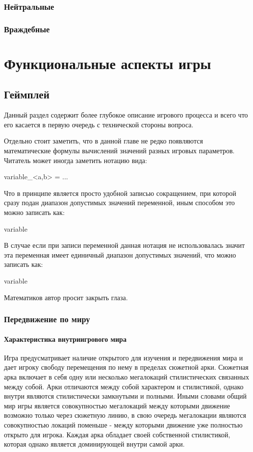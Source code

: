 \documentclass[11pt]{report}
\begin{document}
\section{Нейтральные}
\section{Враждебные}


\part{Функциональные аспекты игры}
\chapter{Геймплей}
Данный раздел содержит более глубокое описание игрового процесса и всего что его касается в первую очередь с технической стороны вопроса.

Отдельно стоит заметить, что в данной главе не редко появляются математические формулы вычислений значений разных игровых параметров. Читатель может иногда заметить нотацию вида:
\begin{myequation}
		variable_{<a,b>} = ...
\end{myequation}
Что в принципе является просто удобной записью сокращением, при которой сразу подан диапазон допустимых значений переменной, иным способом это можно записать как: 
\begin{myequation}
		variable \in [a,b]
\end{myequation}
В случае если при записи переменной данная нотация не использовалась значит эта переменная имеет единичный диапазон допустимых значений, что можно записать как: 
\begin{myequation}
		variable \in [-1,1]
\end{myequation}
Математиков автор просит закрыть глаза.
\newpage

\section{Передвижение по миру}
\subsection{Характеристика внутриигрового мира}
Игра предусматривает наличие открытого для изучения и передвижения мира и дает игроку свободу перемещения по нему в пределах сюжетной арки. Сюжетная арка включает в себя одну или несколько мегалокаций стилистических связанных между собой. Арки отличаются между собой характером и стилистикой, однако внутри являются стилистически замкнутыми и полными.
Иными словами общий мир игры является совокупностью мегалокаций между которыми движение возможно только через сюжетную линию, в свою очередь мегалокации являются совокупностью локаций поменьше - между которыми движение уже полностью открыто для игрока. Каждая арка обладает своей собственной стилистикой, которая однако является доминирующей внутри самой арки.
\end{document}
